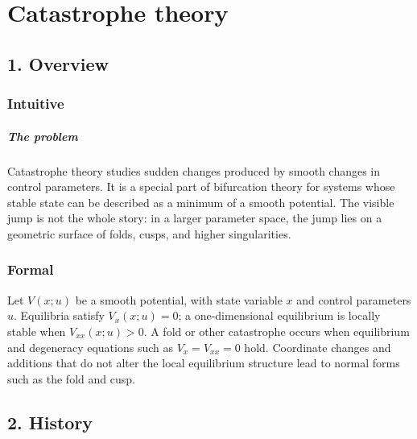 \clearpage\chapter{Catastrophe theory}
\section*{1. Overview}
\subsection*{Intuitive}
\paragraph{The problem}

Catastrophe theory studies sudden changes produced by smooth changes in control parameters. It is a special part of bifurcation theory for systems whose stable state can be described as a minimum of a smooth potential. The visible jump is not the whole story: in a larger parameter space, the jump lies on a geometric surface of folds, cusps, and higher singularities.



\subsection*{Formal}
Let $V(x;u)$ be a smooth potential, with state variable $x$ and control parameters $u$. Equilibria satisfy $V_x(x;u)=0$; a one-dimensional equilibrium is locally stable when $V_{xx}(x;u)>0$. A fold or other catastrophe occurs when equilibrium and degeneracy equations such as $V_x=V_{xx}=0$ hold. Coordinate changes and additions that do not alter the local equilibrium structure lead to normal forms such as the fold and cusp.
\section*{2. History}
